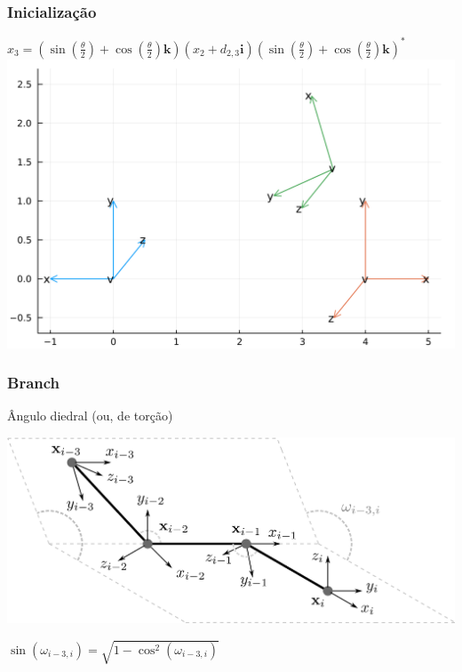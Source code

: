 \documentclass[10pt]{beamer}
\theoremstyle{plain}
\theoremstyle{definition}
\begin{document}
	\begin{frame}
		\frametitle{\normalsize Inicialização} 
		{
			\begin{center}
				$x_3 = (\sin(\frac \theta 2) + \cos(\frac \theta 2)\mathbf k)(x_2 + d_{2,3}\mathbf i)(\sin(\frac \theta 2) + \cos(\frac \theta 2)\mathbf k)^*$
				\\
				
				\vspace{0.5cm}
				\includegraphics[width=0.8\linewidth]{5.png}
			\end{center}
		}	
	\end{frame}
	
	\begin{frame}
		\frametitle{\normalsize Branch} 
		{
			\begin{center}
				Ângulo diedral (ou, de torção)
				
				\vspace{0.5cm}
				\includegraphics[width=0.8\linewidth]{genericConf-4Fidalgo.png}
				\vspace{0.2cm}			
				
				$\sin(\omega_{i-3,i}) = \sqrt{1-\cos^2(\omega_{i-3,i})}$
			\end{center}
		}	
	\end{frame}
\end{document}
